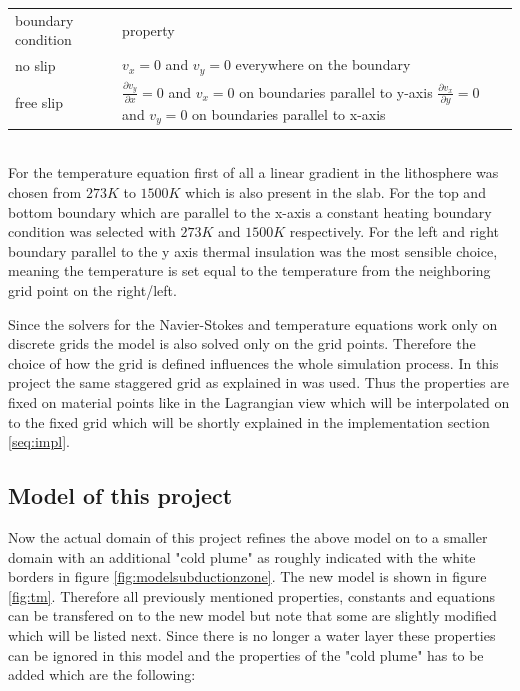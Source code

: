 \documentclass[12pt]{scrreprt}
\begin{document}
\begin{tabular}{ll}
boundary condition&property\\
no slip&$v_x=0$ and $v_y=0$ everywhere on the boundary\\
free slip&\makecell[l]{ $\frac{\partial v_y}{\partial x}=0$ and $v_x=0$ on boundaries parallel to y-axis\\$\frac{\partial v_x}{\partial y}=0$ and $v_y=0$ on boundaries parallel to x-axis }
\end{tabular}\\
For the temperature equation first of all a linear gradient in the lithosphere was chosen from $273K$ to $1500K$ which is also present in the slab. For the top and bottom boundary which are parallel to the x-axis a constant heating boundary condition was selected with $273K$ and $1500K$ respectively. For the left and right boundary parallel to the y axis thermal insulation was the most sensible choice, meaning the temperature is set equal to the temperature from the neighboring grid point on the right/left.

Since the solvers for the Navier-Stokes and temperature equations work only on discrete grids the model is also solved only on the grid points. Therefore the choice of how the grid is defined influences the whole simulation process. In this project the same staggered grid as explained in \cite{gerya2009introduction} was used. Thus the properties are fixed on material points like in the Lagrangian view which will be interpolated on to the fixed grid which will be shortly explained in the implementation section \ref{seq:impl}.

\subsection{Model of this project}
Now the actual domain of this project refines the above model on to a smaller domain with an additional "cold plume" as roughly indicated with the white borders in figure \ref{fig:modelsubductionzone}. The new model is shown in figure \ref{fig:tm}. Therefore all previously mentioned properties, constants and equations can be transfered on to the new model but note that some are slightly modified which will be listed next. Since there is no longer a water layer these properties can be ignored in this model and the properties of the "cold plume" has to be added which are the following:
\end{document}
